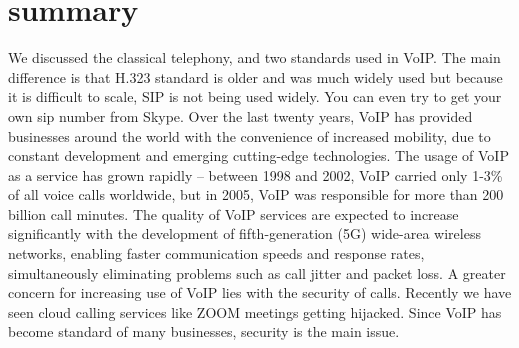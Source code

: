 \documentclass[12pt]{Book}
\begin{document}
    \section{summary}
    We discussed the classical telephony, and two standards used in VoIP. The main difference is that H.323 standard is older and was much widely used but because it is difficult to scale, SIP is not being used widely. You can even try to get your own sip number from Skype.
    \newline
Over the last twenty years, VoIP has provided businesses around the world with the convenience of increased mobility, due to constant development and emerging cutting-edge technologies. The usage of VoIP as a service has grown rapidly – between 1998 and 2002, VoIP carried only 1-3\% of all voice calls worldwide, but in 2005, VoIP was responsible for more than 200 billion call minutes.
 The quality of VoIP services are expected to increase significantly with the development of fifth-generation (5G) wide-area wireless networks, enabling faster communication speeds and response rates, simultaneously eliminating problems such as call jitter and packet loss. A greater concern for increasing use of VoIP lies with the security of calls. Recently we have seen cloud calling services like ZOOM meetings getting hijacked. Since VoIP has become standard of many businesses, security is the main issue.


\end{document}
